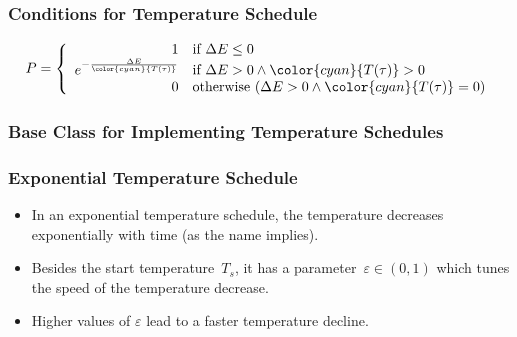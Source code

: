 \documentclass[mathserif]{beamer}%
\begin{document}
\begin{frame}%
\frametitle{Conditions for Temperature Schedule}%
\setcounter{equation}{1}%
\begin{equation}%
P = \left\{\begin{array}{rl}%
1 & \text{if~}\Delta E \leq 0\\%
e^{-\frac{\Delta E}{{\color{cyan}{T(\iteration)}}}} & \text{if~}\Delta E >0 \land {\color{cyan}{T(\iteration)}} > 0\\%
0 & \text{otherwise~}(\Delta E > 0 \land {\color{cyan}{T(\iteration)}}=0)%
\end{array} \right.%
\end{equation}%
%
\end{frame}%
%
\begin{frame}%
\frametitle{Base Class for Implementing Temperature Schedules}%
\end{frame}%
%
\begin{frame}%
\frametitle{Exponential Temperature Schedule}%
\begin{itemize}%
\item In an \alert{exponential temperature schedule}, the temperature decreases exponentially with time (as the name implies).%
\item<2-> Besides the start temperature~$T_s$, it has a parameter~$\varepsilon\in(0,1)$ which tunes the speed of the temperature decrease.%
%
\item<4-> Higher values of $\varepsilon$ lead to a faster temperature decline.
\end{itemize}%
\end{frame}%
\end{document}
